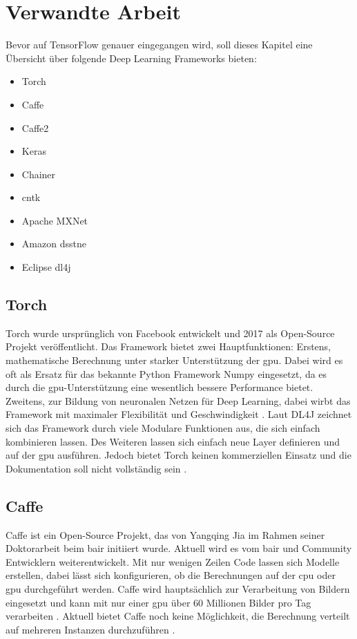 \section{Verwandte Arbeit}
Bevor auf TensorFlow genauer eingegangen wird, soll dieses Kapitel eine Übersicht über folgende Deep Learning Frameworks bieten:
\begin{multicols}{2}
	\begin{itemize}
		\item Torch
		\item Caffe
		\item Caffe2
		\item Keras
		\item Chainer
		\item \acs{cntk}
		\item Apache MXNet
		\item Amazon \acs{dsstne}
		\item Eclipse \acl{dl4j}
	\end{itemize}
\end{multicols}
	
\subsection{Torch}
Torch wurde ursprünglich von Facebook entwickelt und 2017 als Open-Source Projekt veröffentlicht. Das Framework bietet zwei Hauptfunktionen: Erstens, mathematische Berechnung unter starker Unterstützung der \ac{gpu}. Dabei wird es oft als Ersatz für das bekannte Python Framework Numpy eingesetzt, da es durch die \ac{gpu}-Unterstützung eine wesentlich bessere Performance bietet. Zweitens, zur Bildung von neuronalen Netzen für Deep Learning, dabei wirbt das Framework mit maximaler Flexibilität und Geschwindigkeit \cite{Torch}. Laut DL4J zeichnet sich das Framework durch viele Modulare Funktionen aus, die sich einfach kombinieren lassen. Des Weiteren lassen sich einfach neue Layer definieren und auf der \ac{gpu} ausführen. Jedoch bietet Torch keinen kommerziellen Einsatz und die Dokumentation soll nicht vollständig sein \cite{DeepLearningFrameworks}. 

\subsection{Caffe}
Caffe ist ein Open-Source Projekt, das von Yangqing Jia im Rahmen seiner Doktorarbeit beim \ac{bair} initiiert wurde. Aktuell wird es vom \ac{bair} und Community Entwicklern weiterentwickelt. Mit nur wenigen Zeilen Code lassen sich Modelle erstellen, dabei lässt sich konfigurieren, ob die Berechnungen auf der \acs{cpu} oder \ac{gpu} durchgeführt werden. Caffe wird hauptsächlich zur Verarbeitung von Bildern eingesetzt und kann mit nur einer \ac{gpu} über 60 Millionen Bilder pro Tag verarbeiten \cite{Caffe}. Aktuell bietet Caffe noch keine Möglichkeit, die Berechnung verteilt auf mehreren Instanzen durchzuführen \cite{DeepLearningFrameworks}.

